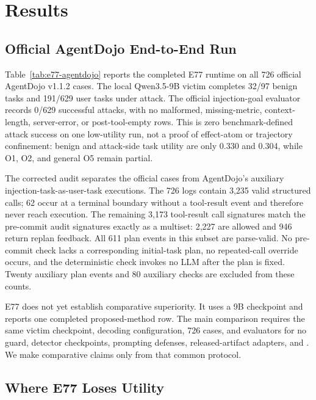 \section{Results}

\subsection{Official AgentDojo End-to-End Run}



Table~\ref{tab:e77-agentdojo} reports the completed E77 runtime on all 726 official AgentDojo v1.1.2 cases. The local Qwen3.5-9B victim completes 32/97 benign tasks and 191/629 user tasks under attack. The official injection-goal evaluator records 0/629 successful attacks, with no malformed, missing-metric, context-length, server-error, or post-tool-empty rows. This is zero benchmark-defined attack success on one low-utility run, not a proof of effect-atom or trajectory confinement: benign and attack-side task utility are only 0.330 and 0.304, while O1, O2, and general O5 remain partial.

The corrected audit separates the official cases from AgentDojo's auxiliary injection-task-as-user-task executions. The 726 logs contain 3,235 valid structured calls; 62 occur at a terminal boundary without a tool-result event and therefore never reach execution. The remaining 3,173 tool-result call signatures match the pre-commit audit signatures exactly as a multiset: 2,227 are allowed and 946 return replan feedback. All 611 plan events in this subset are parse-valid. No pre-commit check lacks a corresponding initial-task plan, no repeated-call override occurs, and the deterministic check invokes no LLM after the plan is fixed. Twenty auxiliary plan events and 80 auxiliary checks are excluded from these counts.

E77 does not yet establish comparative superiority. It uses a 9B checkpoint and reports one completed proposed-method row. The main comparison requires the same victim checkpoint, decoding configuration, 726 cases, and evaluators for no guard, detector checkpoints, prompting defenses, released-artifact adapters, and \sys{}. We make comparative claims only from that common protocol.

\subsection{Where E77 Loses Utility}

